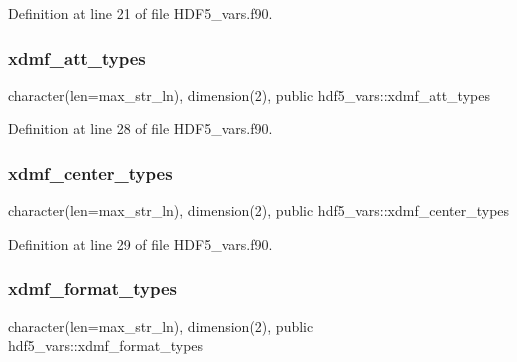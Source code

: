 Definition at line 21 of file H\+D\+F5\+\_\+vars.\+f90.

\mbox{\label{namespacehdf5__vars_a43c511f4b84cd716387c39c78b2cfe54}} 
\subsubsection{\texorpdfstring{xdmf\+\_\+att\+\_\+types}{xdmf\_att\_types}}
{\footnotesize\ttfamily character(len=max\+\_\+str\+\_\+ln), dimension(2), public hdf5\+\_\+vars\+::xdmf\+\_\+att\+\_\+types}



Definition at line 28 of file H\+D\+F5\+\_\+vars.\+f90.

\mbox{\label{namespacehdf5__vars_a7f20d570d2304c8e953646599bf61d73}} 
\subsubsection{\texorpdfstring{xdmf\+\_\+center\+\_\+types}{xdmf\_center\_types}}
{\footnotesize\ttfamily character(len=max\+\_\+str\+\_\+ln), dimension(2), public hdf5\+\_\+vars\+::xdmf\+\_\+center\+\_\+types}



Definition at line 29 of file H\+D\+F5\+\_\+vars.\+f90.

\mbox{\label{namespacehdf5__vars_ab9c0d2270239bf1963c6294ab7198f8c}} 
\subsubsection{\texorpdfstring{xdmf\+\_\+format\+\_\+types}{xdmf\_format\_types}}
{\footnotesize\ttfamily character(len=max\+\_\+str\+\_\+ln), dimension(2), public hdf5\+\_\+vars\+::xdmf\+\_\+format\+\_\+types}



